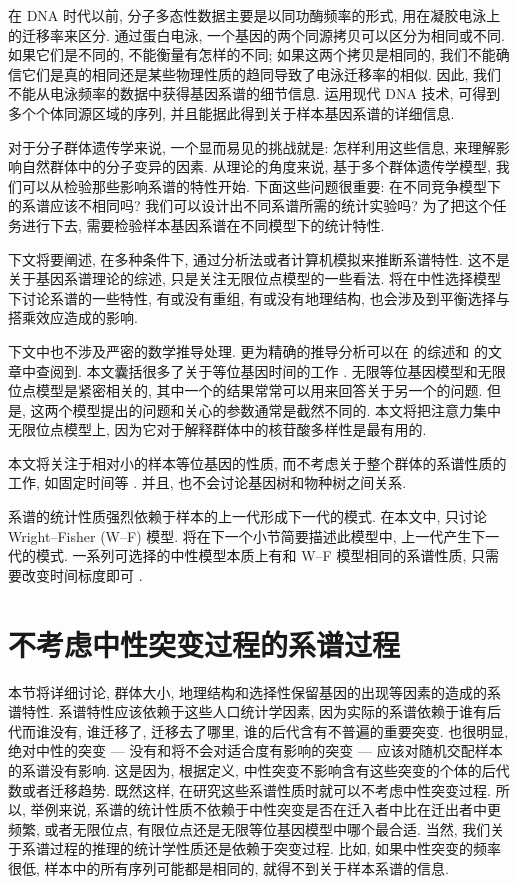 \documentclass[12pt]{article}
\begin{document}
在 DNA 时代以前, 分子多态性数据主要是以同功酶频率的形式, 用在凝胶电泳上的迁移率来区分. 通过蛋白电泳,
一个基因的两个同源拷贝可以区分为相同或不同. 如果它们是不同的, 不能衡量有怎样的不同; 如果这两个拷贝是相同的,
我们不能确信它们是真的相同还是某些物理性质的趋同导致了电泳迁移率的相似. 因此,
我们不能从电泳频率的数据中获得基因系谱的细节信息. 运用现代 DNA 技术, 可得到多个个体同源区域的序列,
并且能据此得到关于样本基因系谱的详细信息.

对于分子群体遗传学来说, 一个显而易见的挑战就是: 怎样利用这些信息, 来理解影响自然群体中的分子变异的因素.
从理论的角度来说, 基于多个群体遗传学模型, 我们可以从检验那些影响系谱的特性开始. 下面这些问题很重要:
在不同竞争模型下的系谱应该不相同吗? 我们可以设计出不同系谱所需的统计实验吗? 为了把这个任务进行下去,
需要检验样本基因系谱在不同模型下的统计特性.

下文将要阐述, 在多种条件下, 通过分析法或者计算机模拟来推断系谱特性. 这不是关于基因系谱理论的综述,
只是关注无限位点模型的一些看法. 将在中性选择模型下讨论系谱的一些特性, 有或没有重组, 有或没有地理结构,
也会涉及到平衡选择与搭乘效应造成的影响.

下文中也不涉及严密的数学推导处理. 更为精确的推导分析可以在 \cite{tavare1984} 的综述和
\cite{watterson1984} 的文章中查阅到. 本文囊括很多了关于等位基因时间的工作
\parencite{donnelly1986, donnelly1986a, tavare1989}.
无限等位基因模型和无限位点模型是紧密相关的, 其中一个的结果常常可以用来回答关于另一个的问题. 但是,
这两个模型提出的问题和关心的参数通常是截然不同的. 本文将把注意力集中无限位点模型上,
因为它对于解释群体中的核苷酸多样性是最有用的.

本文将关注于相对小的样本等位基因的性质, 而不考虑关于整个群体的系谱性质的工作, 如固定时间等
\cite{donnelly1987, watterson1982, watterson1982a}. 并且,
也不会讨论基因树和物种树之间关系.

系谱的统计性质强烈依赖于样本的上一代形成下一代的模式. 在本文中, 只讨论 Wright--Fisher (W--F)
模型. 将在下一个小节简要描述此模型中, 上一代产生下一代的模式. 一系列可选择的中性模型本质上有和 W--F
模型相同的系谱性质, 只需要改变时间标度即可 \parencite{watterson1975, tavare1984,
ewens1990}.

\section{不考虑中性突变过程的系谱过程}

本节将详细讨论, 群体大小, 地理结构和选择性保留基因的出现等因素的造成的系谱特性.
系谱特性应该依赖于这些人口统计学因素, 因为实际的系谱依赖于谁有后代而谁没有, 谁迁移了, 迁移去了哪里,
谁的后代含有不普遍的重要突变. 也很明显, 绝对中性的突变 --- 没有和将不会对适合度有影响的突变 ---
应该对随机交配样本的系谱没有影响. 这是因为, 根据定义, 中性突变不影响含有这些突变的个体的后代数或者迁移趋势.
既然这样, 在研究这些系谱性质时就可以不考虑中性突变过程. 所以, 举例来说,
系谱的统计性质不依赖于中性突变是否在迁入者中比在迁出者中更频繁, 或者无限位点,
有限位点还是无限等位基因模型中哪个最合适. 当然, 我们关于系谱过程的推理的统计学性质还是依赖于突变过程. 比如,
如果中性突变的频率很低, 样本中的所有序列可能都是相同的, 就得不到关于样本系谱的信息.
\end{document}
